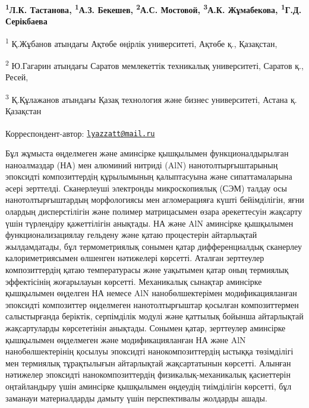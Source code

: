 
\begin{articleheader}

{\bfseries \textsuperscript{1}Л.К. Тастанова\textsuperscript{\envelope },
\textsuperscript{1}А.З. Бекешев, \textsuperscript{2}А.С. Мостовой,
\textsuperscript{3}А.К. Жұмабекова, \textsuperscript{1}Г.Д. Серікбаева}
\end{articleheader}

\begin{affiliation}
\textsuperscript{1} Қ.Жұбанов атындағы Ақтөбе өңірлік университеті,
Ақтөбе қ., Қазақстан,

\textsuperscript{2} Ю.Гагарин атындағы Саратов мемлекеттік техникалық
университеті, Саратов қ., Ресей,

\textsuperscript{3} Қ.Құлажанов атындағы Қазақ технология және бизнес
университеті, Астана қ. Қазақстан

\raggedright {\bfseries \textsuperscript{\envelope }}Корреспондент-автор: \href{mailto:lyazzatt@mail.ru}{\nolinkurl{lyazzatt@mail.ru}}
\end{affiliation}

Бұл жұмыста өңделмеген және аминсірке қышқылымен функционалдырылған
наноалмаздар (НА) мен алюминий нитриді (AlN) нанотолтырғыштарының
эпоксидті композиттердің құрылымының қалыптасуына және сипаттамаларына
әсері зерттелді. Сканерлеуші электронды микроскопиялық (СЭМ) талдау осы
нанотолтырғыштардың морфологиясы мен агломерацияға күшті бейімділігін,
яғни олардың дисперстілігін және полимер матрицасымен өзара әрекеттесуін
жақсарту үшін түрлендіру қажеттілігін анықтады. НА және AlN аминсірке
қышқылымен функционализациялау гельдену және қатаю процестерін
айтарлықтай жылдамдатады, бұл термометриялық сонымен қатар
дифференциалдық сканерлеу калориметриясымен өлшенген нәтижелері
көрсетті. Аталған зерттеулер композиттердің қатаю температурасы және
уақытымен қатар оның термиялық эффектісінің жоғарылауын көрсетті.
Механикалық сынақтар аминсірке қышқылымен өңделген НА немесе AlN
нанобөлшектерімен модификацияланған эпоксидті композиттер өңделмеген
нанотолтырғыштар қосылған композиттермен салыстырғанда беріктік,
серпімділік модулі және қаттылық бойынша айтарлықтай жақсартуларды
көрсететінін анықтады. Сонымен қатар, зерттеулер аминсірке қышқылымен
өңделмеген және модификацияланған НА және AlN нанобөлшектерінің қосылуы
эпоксидті нанокомпозиттердің ыстыққа төзімділігі мен термиялық
тұрақтылығын айтарлықтай жақсартатынын көрсетті. Алынған нәтижелер
эпоксидті нанокомпозиттердің физикалық-механикалық қасиеттерін
оңтайландыру үшін аминсірке қышқылымен өңдеудің тиімділігін көрсетті,
бұл заманауи материалдарды дамыту үшін перспективалы жолдарды ашады.

